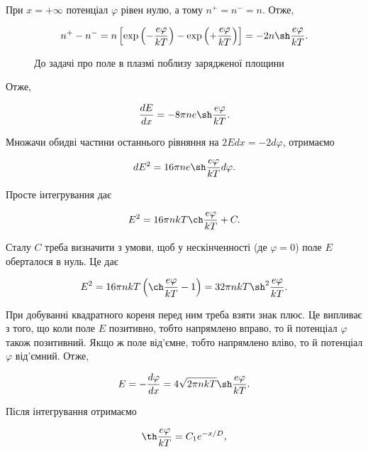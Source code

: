 При $x = +\infty$ потенціал $\varphi$ рівен нулю, а тому $n^+ = n^- = n$. Отже,

\begin{equation*}
	n^+ - n^- = n\left[\exp\left(-\frac{e\varphi}{kT}\right) - \exp\left(+\frac{e\varphi}{kT}\right)\right] = -2n\sh\frac{e\varphi}{kT}.
\end{equation*}

\begin{figure}[h!]\centering
	\caption{До задачі про поле в плазмі поблизу зарядженої площини}
	\label{pic:plasma-field}
\end{figure}

Отже,

\begin{equation*}
	\frac{dE}{dx} = -8\pi ne \sh\frac{e\varphi}{kT}.
\end{equation*}

Множачи обидві частини останнього рівняння на $2Edx = -2d\varphi$, отримаємо

\begin{equation*}
	dE^2 = 16\pi ne \sh\frac{e\varphi}{kT} d\varphi.
\end{equation*}

Просте інтегрування дає

\begin{equation*}
	E^2 = 16\pi nkT \ch\frac{e\varphi}{kT} + C.
\end{equation*}

Сталу $C$ треба визначити з умови, щоб у нескінченності (де $\varphi = 0$) поле $E$ оберталося в нуль. Це дає

\begin{equation*}
	E^2 = 16\pi nkT\left(\ch\frac{e\varphi}{kT} - 1\right) = 32\pi nkT \sh^2\frac{e\varphi}{kT}.
\end{equation*}

При добуванні квадратного кореня перед ним треба взяти знак плюс. Це випливає з того, що коли поле $E$ позитивно, тобто напрямлено вправо, то й потенціал $\varphi$ також позитивний. Якщо ж поле від'ємне, тобто напрямлено вліво, то й потенціал $\varphi$ від'ємний. Отже,

\begin{equation}\label{eq:plasma-field}
	E = -\frac{d\varphi}{dx} = 4\sqrt{2\pi nkT}\sh\frac{e\varphi}{kT}.
\end{equation}

Після інтегрування отримаємо

\begin{equation*}
	\th\frac{e\varphi}{kT} = C_1 e^{-x/D},
\end{equation*}

